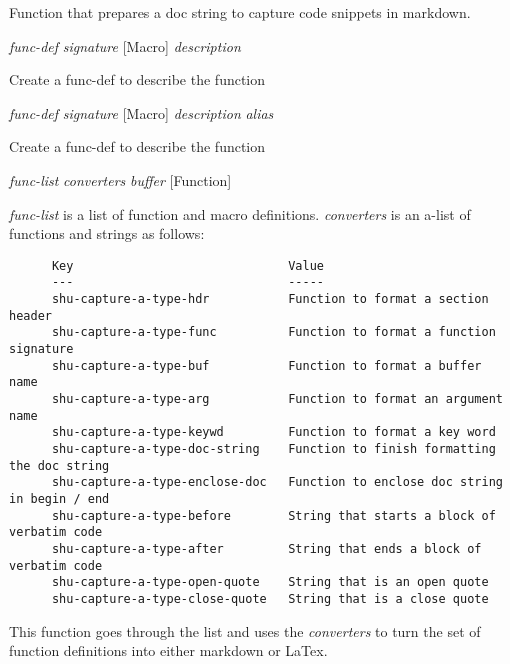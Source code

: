 \begin{doc-string}
Function that prepares a doc string to capture code snippets in markdown.
\end{doc-string}

\vspace{1em}
\noindent
{}
\usebox{\funcname}\emph{func-def} \emph{signature}
 \hfill [Macro]
\hspace*{\wd\funcname}\emph{description}

\begin{doc-string}
Create a func-def to describe the function
\end{doc-string}

\vspace{1em}
\noindent
{}
\usebox{\funcname}\emph{func-def} \emph{signature}
 \hfill [Macro]
\hspace*{\wd\funcname}\emph{description} \emph{alias}

\begin{doc-string}
Create a func-def to describe the function
\end{doc-string}

\vspace{1em}
\noindent
{}
\usebox{\funcname}\emph{func-list} \emph{converters} \emph{buffer}
 \hfill [Function]
\hspace*{\wd\funcname}

\begin{doc-string}
\emph{func-list} is a list of function and macro definitions.  \emph{converters}
is an a-list of functions and strings as
follows:

\small{\begin{verbatim}
      Key                              Value
      ---                              -----
      shu-capture-a-type-hdr           Function to format a section header
      shu-capture-a-type-func          Function to format a function signature
      shu-capture-a-type-buf           Function to format a buffer name
      shu-capture-a-type-arg           Function to format an argument name
      shu-capture-a-type-keywd         Function to format a key word
      shu-capture-a-type-doc-string    Function to finish formatting the doc string
      shu-capture-a-type-enclose-doc   Function to enclose doc string in begin / end
      shu-capture-a-type-before        String that starts a block of verbatim code
      shu-capture-a-type-after         String that ends a block of verbatim code
      shu-capture-a-type-open-quote    String that is an open quote
      shu-capture-a-type-close-quote   String that is a close quote
\end{verbatim}}

This function goes through the list and uses the \emph{converters} to turn the set of
function definitions into either markdown or LaTex.
\end{doc-string}

